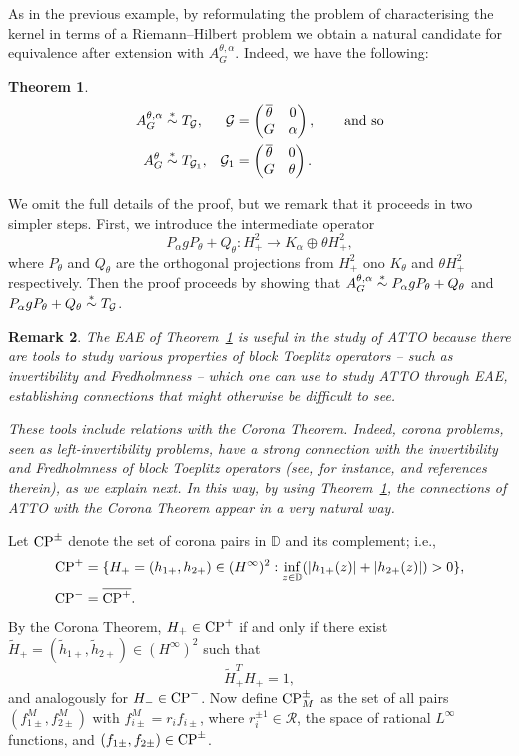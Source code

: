 \documentclass[11pt]{article}
\newtheorem{thm}{Theorem}[section]
\newtheorem{rem}[thm]{Remark}
\def\DD{\mathbb D}
\def\G{\mathcal G}
\def\GR{\mathcal R}
\def\ol{\overline}
\def\wt{\widetilde}
\newcommand{\simast}{%
    \ensuremath{%
       \stackrel{\mathsf{\ast}}{\sim}}}
\def\CP{{\rm CP}}
\begin{document}
As in the previous example, by reformulating the problem of characterising the kernel in terms
of a Riemann--Hilbert problem we obtain a natural candidate for equivalence after extension
with $A^{\theta,\alpha}_G$. Indeed, we have the following:

\begin{thm}\label{thm:1} \cite{CP16,CP17}
\begin{align}
A_G^{\theta,\alpha} & \simast T_\G, & \G&=\begin{pmatrix} \ol\theta & 0 \\ G & \alpha \end{pmatrix}, \qquad \hbox{and so} \nonumber\\
A_G^{\theta} & \simast T_{\G_1}, & {\G_1}&=\begin{pmatrix} \ol\theta & 0 \\ G & \theta \end{pmatrix}.
\end{align}
\end{thm}

We omit the full details of the proof, but we remark that it proceeds in two simpler steps. First,
we introduce the intermediate operator 
\[
P_\alpha g P_\theta + Q_\theta: H^2_+ \to K_\alpha \oplus \theta H^2_+,
\]
where $P_\theta$ and $Q_\theta$ are the orthogonal projections from $H^2_+$ ono $K_\theta$ and $\theta H^2_+$
respectively. Then the proof proceeds by showing that
$A_G^{\theta,\alpha}   \simast P_\alpha g P_\theta + Q_\theta$ and  
$P_\alpha g P_\theta + Q_\theta \simast T_\G$.\\

\begin{rem}{\rm
The EAE of Theorem~\ref{thm:1} is useful in the study of ATTO
because there are tools to study various properties of block Toeplitz operators -- such as invertibility and Fredholmness -- which one can use to study ATTO through EAE, establishing connections that might otherwise be difficult to see.

These tools include relations with the Corona Theorem. Indeed, corona problems, seen as left-invertibility problems, have a strong connection with the invertibility and Fredholmness of block Toeplitz operators
(see, for instance, \cite{CP17} and references therein), as we explain next. In this way, by using Theorem~\ref{thm:1}, the connections of ATTO with the Corona Theorem appear in  a
very natural way.
}
\end{rem}

Let $\CP^\pm$ denote the set of corona pairs in $\DD$ and its complement; i.e.,
\begin{align*}
\CP^+ &= \{H_+=(h_{1+},h_{2+}) \in (H^\infty)^2: \inf_{z \in \DD} (|h_{1+}(z)|+|h_{2+}(z)|)>0\},\\
\CP^- &= \ol{\CP^+}.
\end{align*}
By the Corona Theorem, $H_+ \in \CP^+$ if and only if there exist 
$\wt H_+ =(\wt h_{1+} ,\wt h_{2+} ) \in (H^\infty)^2$ such that
\[
\wt H_+^T H_+ = 1,
\]
and analogously for $H_- \in \CP^-$. Now define $\CP^\pm_M$ as the set of all pairs $(f^M_{1\pm},f^M_{2\pm})$ with $f^M_{i\pm}=r_i f_{i\pm}$, where
$r_i^{\pm 1} \in \GR$, the space of rational $L^\infty$ functions, and $(f_{1\pm},f_{2\pm}) \in \CP^\pm$.
\end{document}
